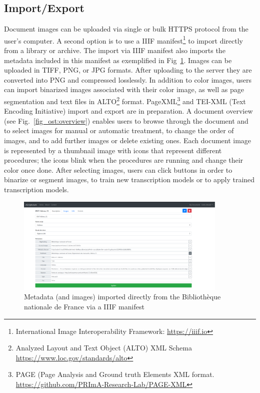 \subsection{Import/Export}

Document images can be uploaded via single or bulk HTTPS protocol from the
user’s computer. A second option is to use a
IIIF manifest\footnote{International Image Interoperability Framework:
\url{https://iiif.io}} to import directly from a library or archive. The import
via IIIF manifest also imports the metadata included in this manifest as
exemplified in Fig~\ref{fig_ost:iiif}.  Images can be uploaded in TIFF, PNG, or JPG formats.
After uploading to the server they are converted into PNG and compressed
losslessly. In addition to color images, users can import binarized images
associated with their color image, as well as page segmentation and text files
in ALTO\footnote{Analyzed Layout and Text Object (ALTO) XML Schema
\url{https://www.loc.gov/standards/alto}} format.  PageXML\footnote{PAGE (Page
Analysis and Ground truth Elements XML format.
\url{https://github.com/PRImA-Research-Lab/PAGE-XML}} and TEI-XML (Text
Encoding Initiative) import and export are in preparation. A document overview
(see Fig.~\ref{fig_ost:overview}) enables users to browse through the document and to select images
for manual or automatic treatment, to change the order of images, and to add
further images or delete existing ones.  Each document image is represented by
a thumbnail image with icons that represent different procedures; the icons
blink when the procedures are running and change their color once done. After
selecting images, users can click buttons in order to binarize or segment
images, to train new transcription models or to apply trained transcription
models.

\begin{figure}
	\centering
	\includegraphics[width=0.9\textwidth]{IIIF_import.png}
	\caption{Metadata (and images) imported directly from the Bibliothèque nationale de France via a IIIF manifest}
	\label{fig_ost:iiif}
\end{figure}

